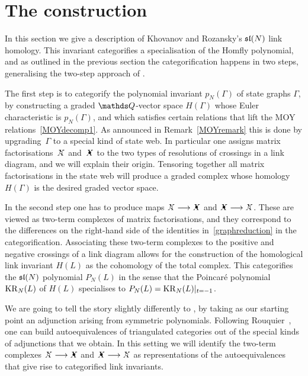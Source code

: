 \documentclass{compositio}
\theoremstyle{definition}
\numberwithin{equation}{section}
\begin{document}
\section{The construction}
\label{KRconstruction}

In this section we give a description of Khovanov and Rozansky's $\mathfrak{sl}(N)$ link homology. This invariant categorifies a specialisation of the Homfly polynomial, and as outlined in the previous section the categorification happens in two steps, generalising the two-step approach of \cite{moy1998}. 

The first step is to categorify the polynomial invariant $p_N(\Gamma)$ of state graphs $\Gamma$, by constructing a graded $\QQ$-vector space $H(\Gamma)$ whose Euler characteristic is $p_N(\Gamma)$, and which satisfies certain relations that lift the MOY relations~\eqref{MOYdecomp1}. As announced in Remark~\ref{MOYremark} this is done by upgrading~$\Gamma$ to a special kind of state web. In particular one assigns matrix factorisations~$\Xcirc$ and~$\Xbul$ to the two types of resolutions of crossings in a link diagram, and we will explain their origin. Tensoring together all matrix factorisations in the state web will produce a graded complex whose homology $H(\Gamma)$ is the desired graded vector space.

In the second step one has to produce maps $\Xcirc \lto \Xbul$ and $\Xbul \lto \Xcirc$. These are viewed as two-term complexes of matrix factorisations, and they correspond to the differences on the right-hand side of the identities in~\eqref{graphreduction} in the categorification. Associating these two-term complexes to the positive and negative crossings of a link diagram allows for the construction of the homological link invariant $H(L)$ as the cohomology of the total complex. This categorifies the $\mathfrak{sl}(N)$ polynomial $P_{N}(L)$ in the sense that the Poincar\'e polynomial $\operatorname{KR}_{N}(L)$ of $H(L)$ specialises to $P_{N}(L)=\operatorname{KR}_{N}(L)|_{t=-1}$. 

We are going to tell the story slightly differently to \cite{kr0401268}, by taking as our starting point an adjunction arising from symmetric polynomials. Following Rouquier~\cite{RouquierMexico}, one can build autoequivalences of triangulated categories out of the special kinds of adjunctions that we obtain. In this setting we will identify the two-term complexes $\Xcirc \lto \Xbul$ and $\Xbul \lto \Xcirc$ as representations of the autoequivalences that give rise to categorified link invariants. 
\end{document}
